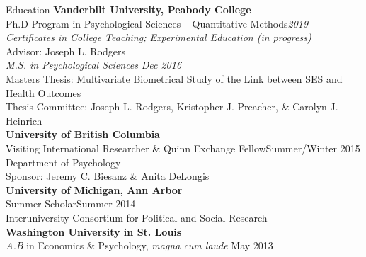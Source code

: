 \begin{rSection}{\textrm{Education}}
{\bf Vanderbilt University, Peabody College}\\
Ph.D Program in Psychological Sciences -- Quantitative Methods\hfill{\em 2019} \\
\hspace*{\pindent}\textit{Certificates in College Teaching; Experimental Education (in progress)}\\
\hspace*{\pindent}Advisor: Joseph L. Rodgers%
\smallskip\\
\textit{M.S. in Psychological Sciences} \hfill{\em Dec 2016} \\
\hspace*{\pindent}Masters Thesis: Multivariate Biometrical Study of the Link between SES and Health Outcomes\\
\hspace*{\pindent}Thesis Committee: Joseph L. Rodgers, Kristopher J. Preacher, \& Carolyn J. Heinrich %
\medskip\\
\textbf{University of British Columbia}\\
Visiting International Researcher \& Quinn Exchange Fellow\hfill{Summer/Winter 2015}\\
\hspace*{\pindent}Department of Psychology\\
\hspace*{\pindent}Sponsor: Jeremy C. Biesanz \& Anita DeLongis\medskip\\
\textbf{University of Michigan, Ann Arbor}\\
Summer Scholar\hfill{Summer 2014}\\
\hspace*{\pindent}Interuniversity Consortium for Political and Social Research\medskip\\
{\bf Washington University in St. Louis}\\
{\em A.B} in Economics \& Psychology, \textit{magna cum laude} \hfill{May 2013}%
\end{rSection}